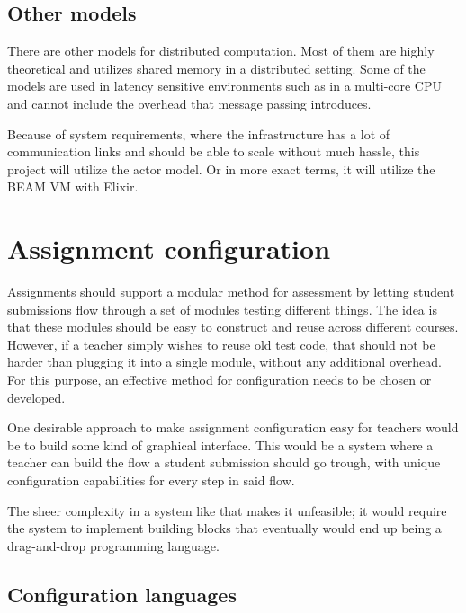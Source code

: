 \subsection{Other models}

There are other models for distributed computation. Most of them are highly theoretical and utilizes shared memory in a distributed setting. Some of the models are used in latency sensitive environments such as in a multi-core CPU and cannot include the overhead that message passing introduces.

Because of system requirements, where the infrastructure has a lot of communication links and should be able to scale without much hassle, this project will utilize the actor model. Or in more exact terms, it will utilize the BEAM VM with Elixir.

\section{Assignment configuration}

Assignments should support a modular method for assessment by letting student submissions flow through a set of modules testing different things. The idea is that these modules should be easy to construct and reuse across different courses. However, if a teacher simply wishes to reuse old test code, that should not be harder than plugging it into a single module, without any additional overhead. For this purpose, an effective method for configuration needs to be chosen or developed.


One desirable approach to make assignment configuration easy for teachers would be to build some kind of graphical interface. This would be a system where a teacher can build the flow a student submission should go trough, with unique configuration capabilities for every step in said flow.

The sheer complexity in a system like that makes it unfeasible; it would require the system to implement building blocks that eventually would end up being a drag-and-drop programming language.

\subsection{Configuration languages}

